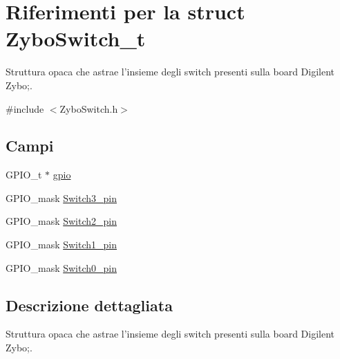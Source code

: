 \hypertarget{struct_zybo_switch__t}{\section{Riferimenti per la struct Zybo\+Switch\+\_\+t}
\label{struct_zybo_switch__t}
}


Struttura opaca che astrae l'insieme degli switch presenti sulla board Digilent Zybo;.  




{\ttfamily \#include $<$Zybo\+Switch.\+h$>$}

\subsection*{Campi}
\begin{DoxyCompactItemize}
\item 
G\+P\+I\+O\+\_\+t $\ast$ \hyperlink{struct_zybo_switch__t_acb3116190992a4d8d26545c103304d27}{gpio}
\item 
G\+P\+I\+O\+\_\+mask \hyperlink{struct_zybo_switch__t_a6b95420b88fe8c1fd7f347ce3ae1906b}{Switch3\+\_\+pin}
\item 
G\+P\+I\+O\+\_\+mask \hyperlink{struct_zybo_switch__t_a33eda4a0115ef585edd90078924ca56e}{Switch2\+\_\+pin}
\item 
G\+P\+I\+O\+\_\+mask \hyperlink{struct_zybo_switch__t_a6a3a5739e7e8f138241cafeeb7c1a33f}{Switch1\+\_\+pin}
\item 
G\+P\+I\+O\+\_\+mask \hyperlink{struct_zybo_switch__t_a5b7f83cd96441b7d1692710c6499147c}{Switch0\+\_\+pin}
\end{DoxyCompactItemize}


\subsection{Descrizione dettagliata}
Struttura opaca che astrae l'insieme degli switch presenti sulla board Digilent Zybo;. 

